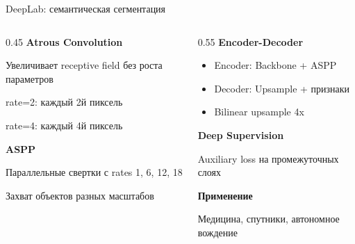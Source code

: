 \documentclass[aspectratio=169, 9pt]{beamer}
\begin{document}
\begin{frame}{DeepLab: семантическая сегментация}
\begin{columns}[T]
\begin{column}{0.45\textwidth}
{\bfseries\textcolor{blue!70}{Atrous Convolution}}

{\small Увеличивает receptive field без роста параметров}

{\small rate=2: каждый 2й пиксель}

{\small rate=4: каждый 4й пиксель}

\vspace{0.3em}
{\bfseries\textcolor{green!50!black}{ASPP}}

{\small Параллельные свертки с rates 1, 6, 12, 18}

{\small Захват объектов разных масштабов}
\end{column}

\begin{column}{0.55\textwidth}
{\bfseries\textcolor{blue!70}{Encoder-Decoder}}

{\small
\begin{itemize}
    \item Encoder: Backbone + ASPP
    \item Decoder: Upsample + признаки
    \item Bilinear upsample 4x
\end{itemize}
}

\vspace{0.3em}
{\bfseries\textcolor{green!50!black}{Deep Supervision}}

{\small Auxiliary loss на промежуточных слоях}

\vspace{0.3em}
{\bfseries\textcolor{blue!70}{Применение}}

{\small Медицина, спутники, автономное вождение}
\end{column}
\end{columns}
\end{frame}
\end{document}
